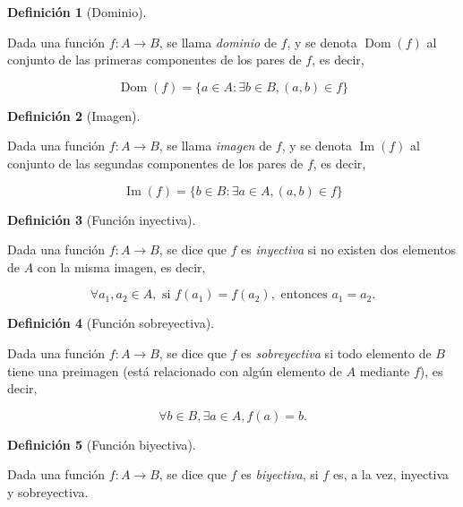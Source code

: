 \documentclass[
  a4paper,
]{scrreport}
\theoremstyle{plain}
\theoremstyle{plain}
\theoremstyle{definition}
\newtheorem{definition}{Definición}[chapter]
\theoremstyle{definition}
\theoremstyle{plain}
\theoremstyle{remark}
\begin{document}
\begin{definition}[Dominio]\protect\hypertarget{def-dominio-funcion}{}\label{def-dominio-funcion}

Dada una función \(f:A\rightarrow B\), se llama \emph{dominio} de \(f\),
y se denota \(\operatorname{Dom}(f)\) al conjunto de las primeras
componentes de los pares de \(f\), es decir,

\[\operatorname{Dom}(f) = \{a\in A: \exists b\in B, (a,b)\in f\}\]

\end{definition}

\begin{definition}[Imagen]\protect\hypertarget{def-imagen-funcion}{}\label{def-imagen-funcion}

Dada una función \(f:A\rightarrow B\), se llama \emph{imagen} de \(f\),
y se denota \(\operatorname{Im}(f)\) al conjunto de las segundas
componentes de los pares de \(f\), es decir,

\[\operatorname{Im}(f) = \{b\in B: \exists a\in A, (a,b)\in f\}\]

\end{definition}

\begin{definition}[Función
inyectiva]\protect\hypertarget{def-funcion-inyectiva}{}\label{def-funcion-inyectiva}

Dada una función \(f:A\rightarrow B\), se dice que \(f\) es
\emph{inyectiva} si no existen dos elementos de \(A\) con la misma
imagen, es decir,

\[\forall a_1, a_2 \in A, \mbox{ si } f(a_1) = f(a_2), \mbox{ entonces } a_1 = a_2.\]

\end{definition}

\begin{definition}[Función
sobreyectiva]\protect\hypertarget{def-funcion-sobreyectiva}{}\label{def-funcion-sobreyectiva}

Dada una función \(f:A\rightarrow B\), se dice que \(f\) es
\emph{sobreyectiva} si todo elemento de \(B\) tiene una preimagen (está
relacionado con algún elemento de \(A\) mediante \(f\)), es decir,

\[\forall b \in B, \exists a\in A, f(a) = b.\]

\end{definition}

\begin{definition}[Función
biyectiva]\protect\hypertarget{def-funcion-biyectiva}{}\label{def-funcion-biyectiva}

Dada una función \(f:A\rightarrow B\), se dice que \(f\) es
\emph{biyectiva}, si \(f\) es, a la vez, inyectiva y sobreyectiva.

\end{definition}
\end{document}
